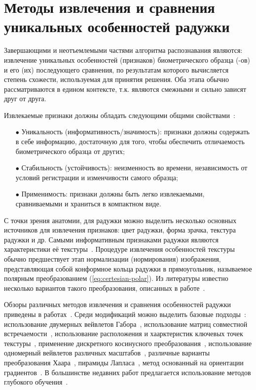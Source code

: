 \chapter{Методы извлечения и сравнения уникальных особенностей радужки}
\label{chapter:fem_methods}

Завершающими и неотъемлемыми частями алгоритма распознавания являются: извлечение уникальных особенностей (признаков) биометрического образца (-ов) и его (их) последующего сравнения, по результатам которого вычисляется степень схожести, используемая для принятия решения. Оба этапа обычно рассматриваются в едином контексте, т.к. являются смежными и сильно зависят друг от друга.

Извлекаемые признаки должны обладать следующими общими свойствами~\cite{jain_2004,matveev_doctor_thesis}:

\begin{enumerate}
	\item[$\bullet$] Уникальность (информативность/значимость): признаки должны содержать в себе информацию, достаточную для того, чтобы обеспечить отличаемость биометрического образца от других;
	\item[$\bullet$] Стабильность (устойчивость): неизменность во времени, независимость от условий регистрации и изменчивости самого образца;
	\item[$\bullet$] Применимость: признаки должны быть легко извлекаемыми, сравниваемыми и храниться в компактном виде.
\end{enumerate}

С точки зрения анатомии, для радужки можно выделить несколько основных источников для извлечения признаков: цвет радужки, форма зрачка, текстура радужки и др. Самыми информативным признаками радужки являются характеристики её текстуры~\cite{daugman_how_works}. Процедуре извлечения особенностей текстуры обычно предшествует этап нормализации (нормирования) изображения, представляющая собой конформное кольца радужки в прямоугольник, называемое полярным преобразованием (\ref{eq:certesian-polar}). Из литературы известно несколько вариантов такого преобразования, описанных в работе~\cite{arvacheh_2006}.

Обзоры различных методов извлечения и сравнения особенностей радужки приведены в работах~\cite{bowyer_survey_2008, bowyer_handbook_2012, ng_overview_2008, rathgeb_2011}. Среди модификаций можно выделить базовые подходы~\cite{matveev_doctor_thesis}: использование двумерных вейвлетов Габора~\cite{daugman_how_works}, использование матриц совместной встречаемости~\cite{gupta_2005,zaim_2006}, использование расположения и хаарктеристик ключевых точек текстуры~\cite{pranith_2010}, применение дискретного косинусного преобразования~\cite{monro_2007}, использование одномерный вейвлетов различных масштабов~\cite{boles_1998}, различные варианты преобразования Хаара~\cite{lim_2001,popescu_2011}, пирамиды Лапласа~\cite{wildes_1994}, метод основанный на ориентации градиентов~\cite{takano_2011}. В большинстве недавних работ предлагается использование методов глубокого обучения~\cite{liu_2016_di,gangwar_2016,proenca_2017,zhao_2017,tang_2017}.

